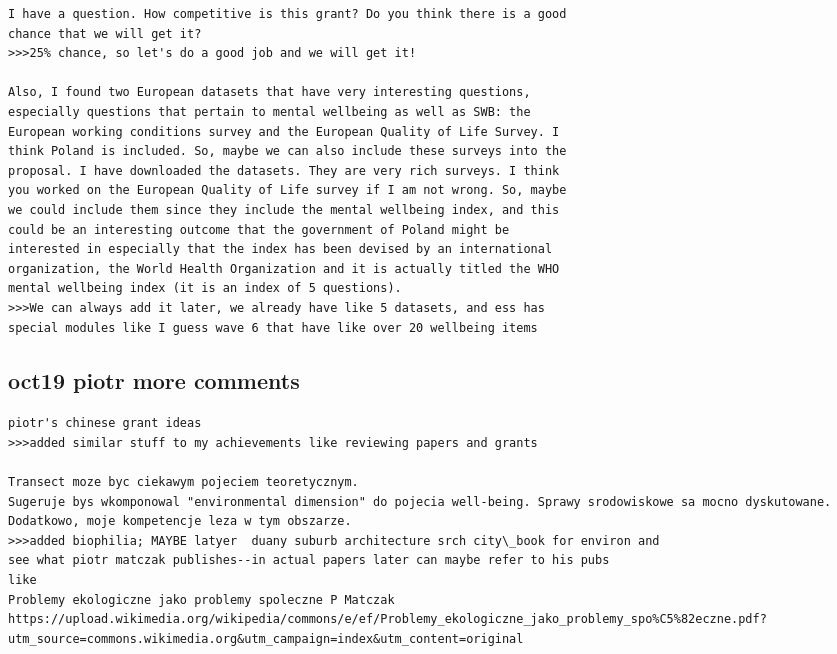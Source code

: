 \documentclass[10pt, letterpaper]{article}
\begin{document}
\begin{spacing}{1.4}
\begin{scriptsize}
\begin{spacing}{1}
\begin{verbatim}
I have a question. How competitive is this grant? Do you think there is a good
chance that we will get it?
>>>25% chance, so let's do a good job and we will get it!

Also, I found two European datasets that have very interesting questions,
especially questions that pertain to mental wellbeing as well as SWB: the
European working conditions survey and the European Quality of Life Survey. I
think Poland is included. So, maybe we can also include these surveys into the
proposal. I have downloaded the datasets. They are very rich surveys. I think
you worked on the European Quality of Life survey if I am not wrong. So, maybe
we could include them since they include the mental wellbeing index, and this
could be an interesting outcome that the government of Poland might be
interested in especially that the index has been devised by an international
organization, the World Health Organization and it is actually titled the WHO
mental wellbeing index (it is an index of 5 questions).
>>>We can always add it later, we already have like 5 datasets, and ess has
special modules like I guess wave 6 that have like over 20 wellbeing items

\end{verbatim}
\end{spacing}
\end{scriptsize}

\subsection{oct19 piotr more comments} 


\begin{scriptsize}
\begin{spacing}{1} 
\begin{verbatim}
piotr's chinese grant ideas
>>>added similar stuff to my achievements like reviewing papers and grants

Transect moze byc ciekawym pojeciem teoretycznym.
Sugeruje bys wkomponowal "environmental dimension" do pojecia well-being. Sprawy srodowiskowe sa mocno dyskutowane. Dodatkowo, moje kompetencje leza w tym obszarze.
>>>added biophilia; MAYBE latyer  duany suburb architecture srch city\_book for environ and
see what piotr matczak publishes--in actual papers later can maybe refer to his pubs
like
Problemy ekologiczne jako problemy spoleczne P Matczak
https://upload.wikimedia.org/wikipedia/commons/e/ef/Problemy_ekologiczne_jako_problemy_spo%C5%82eczne.pdf?utm_source=commons.wikimedia.org&utm_campaign=index&utm_content=original



\end{verbatim}
\end{spacing}
\end{scriptsize}
\end{spacing}
\end{document}
